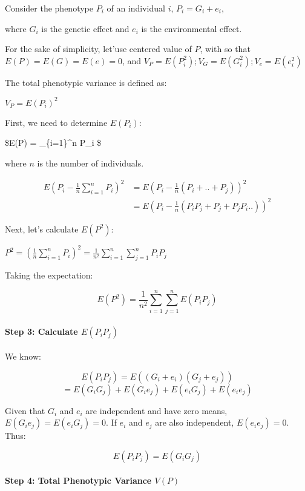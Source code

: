 \documentclass[
]{article}
\begin{document}
Consider the phenotype \(P_i\) of an individual \(i\),
\(P_i = G_i + e_i\),

where \(G_i\) is the genetic effect and \(e_i\) is the environmental
effect.

For the sake of simplicity, let'use centered value of \(P\), with so
that \(E(P)=E(G)=E(e)=0\), and
\(V_P=E(P_i^2); V_G=E(G_i^2) ; V_e=E(e_i^2)\)

The total phenotypic variance is defined as:

\(V_P = E(P_i)^2\)

First, we need to determine \(E(P_i)\):

\$E(P) =  \sum\_\{i=1\}\^{}n P\_i \$

where \(n\) is the number of individuals.

\[\begin{split}
E(P_i-\frac{1}{n} \sum_{i=1}^n P_i )^2 &= E(P_i-\frac{1}{n} (P_i+..+P_j ))^2\\
&=E(P_i - \frac{1}{n}(P_iP_j + P_j + P_jP_i..))^2
\end{split}\]

Next, let's calculate \(E(P^2)\):

\(P^2 = \left( \frac{1}{n} \sum_{i=1}^n P_i \right)^2 = \frac{1}{n^2} \sum_{i=1}^n \sum_{j=1}^n P_i P_j\)

Taking the expectation:

\[ E(P^2) = \frac{1}{n^2} \sum_{i=1}^n \sum_{j=1}^n E(P_i P_j) \]

\paragraph{\texorpdfstring{Step 3: Calculate
\(E(P_i P_j)\)}{Step 3: Calculate E(P\_i P\_j)}}\label{step-3-calculate-ep_i-p_j}

We know:

\[ E(P_i P_j) = E((G_i + e_i)(G_j + e_j)) \]
\[ = E(G_i G_j) + E(G_i e_j) + E(e_i G_j) + E(e_i e_j) \]

Given that \(G_i\) and \(e_i\) are independent and have zero means,
\(E(G_i e_j) = E(e_i G_j) = 0\). If \(e_i\) and \(e_j\) are also
independent, \(E(e_i e_j) = 0\). Thus:

\[ E(P_i P_j) = E(G_i G_j) \]

\paragraph{\texorpdfstring{Step 4: Total Phenotypic Variance
\(V(P)\)}{Step 4: Total Phenotypic Variance V(P)}}\label{step-4-total-phenotypic-variance-vp}
\end{document}
